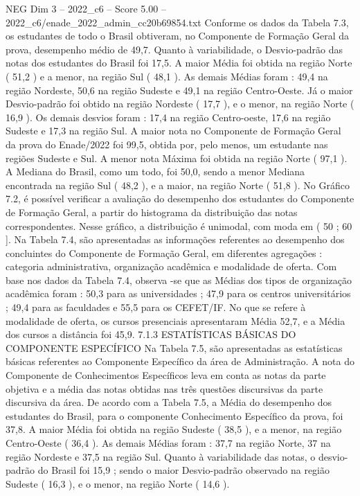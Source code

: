 \begin{textsample}{NEG Dim 3 – 2022\_c6 – Score 5.00 – 2022\_c6/enade\_2022\_admin\_cc20b69854.txt}
Conforme os dados da Tabela 7.3, os estudantes de todo o Brasil obtiveram, no Componente de Formação Geral da prova, desempenho médio de 49,7.
Quanto à variabilidade, o Desvio-padrão das notas dos estudantes do Brasil foi 17,5.
A maior Média foi obtida na região Norte ( 51,2 ) e a menor, na região Sul ( 48,1 ).
As demais Médias foram : 49,4 na região Nordeste, 50,6 na região Sudeste e 49,1 na região Centro-Oeste.
Já o maior Desvio-padrão foi obtido na região Nordeste ( 17,7 ), e o menor, na região Norte ( 16,9 ).
Os demais desvios foram : 17,4 na região Centro-oeste, 17,6 na região Sudeste e 17,3 na região Sul.
A maior nota no Componente de Formação Geral da prova do Enade/2022 foi 99,5, obtida por, pelo menos, um estudante nas regiões Sudeste e Sul.
A menor nota Máxima foi obtida na região Norte ( 97,1 ).
A Mediana do Brasil, como um todo, foi 50,0, sendo a menor Mediana encontrada na região Sul ( 48,2 ), e a maior, na região Norte ( 51,8 ).
No Gráfico 7.2, é possível verificar a avaliação do desempenho dos estudantes do Componente de Formação Geral, a partir do histograma da distribuição das notas correspondentes.
Nesse gráfico, a distribuição é unimodal, com moda em ( 50 ; 60 ].
Na Tabela 7.4, são apresentadas as informações referentes ao desempenho dos concluintes do Componente de Formação Geral, em diferentes agregações : categoria administrativa, organização acadêmica e modalidade de oferta.
Com base nos dados da Tabela 7.4, observa -se que as Médias dos tipos de organização acadêmica foram : 50,3 para as universidades ; 47,9 para os centros universitários ; 49,4 para as faculdades e 55,5 para os CEFET/IF.
No que se refere à modalidade de oferta, os cursos presenciais apresentaram Média 52,7, e a Média dos cursos a distância foi 45,9. 7.1.3 ESTATÍSTICAS BÁSICAS DO COMPONENTE ESPECÍFICO Na Tabela 7.5, são apresentadas as estatísticas básicas referentes ao Componente Específico da área de Administração.
A nota do Componente de Conhecimentos Específicos leva em conta as notas da parte objetiva e a média das notas obtidas nas três questões discursivas da parte discursiva da área.
De acordo com a Tabela 7.5, a Média do desempenho dos estudantes do Brasil, para o componente Conhecimento Específico da prova, foi 37,8.
A maior Média foi obtida na região Sudeste ( 38,5 ), e a menor, na região Centro-Oeste ( 36,4 ).
As demais Médias foram : 37,7 na região Norte, 37 na região Nordeste e 37,5 na região Sul.
Quanto à variabilidade das notas, o desvio-padrão do Brasil foi 15,9 ; sendo o maior Desvio-padrão observado na região Sudeste ( 16,3 ), e o menor, na região Norte ( 14,6 ).

\end{textsample}
